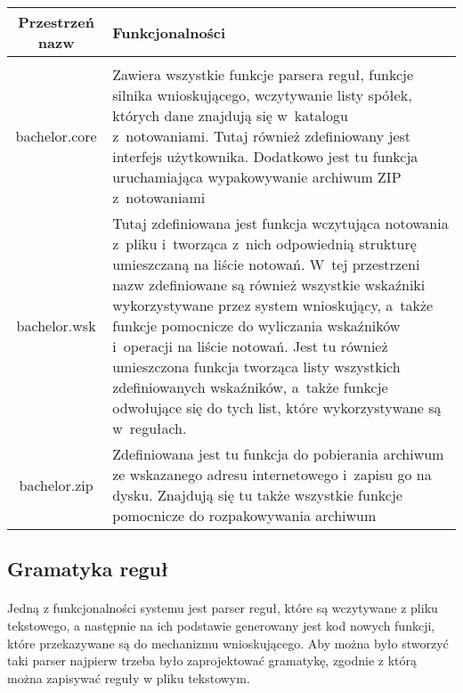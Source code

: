 \begin{tabular}{ c p{}}
Przestrzeń nazw & Funkcjonalności \\ \hline \\
bachelor.core & Zawiera wszystkie funkcje parsera reguł, funkcje silnika wnioskującego, wczytywanie listy spółek, których dane znajdują się w~katalogu z~notowaniami. Tutaj również zdefiniowany jest interfejs użytkownika. Dodatkowo jest tu funkcja uruchamiająca wypakowywanie archiwum ZIP z~notowaniami \\
bachelor.wsk & Tutaj zdefiniowana jest funkcja wczytująca notowania z~pliku i~tworząca z~nich odpowiednią strukturę umieszczaną na liście notowań. W~tej przestrzeni nazw zdefiniowane są również wszystkie wskaźniki wykorzystywane przez system wnioskujący, a~także funkcje pomocnicze do wyliczania wskaźników i~operacji na liście notowań. Jest tu również umieszczona funkcja tworząca listy wszystkich zdefiniowanych wskaźników, a~także funkcje odwołujące się do tych list, które wykorzystywane są w~regułach. \\
bachelor.zip & Zdefiniowana jest tu funkcja do pobierania archiwum ze wskazanego adresu internetowego i~zapisu go na dysku. Znajdują się tu także wszystkie funkcje pomocnicze do rozpakowywania archiwum \\
\end{tabular}

\subsection{Gramatyka reguł}

\paragraph{}
Jedną z funkcjonalności systemu jest parser reguł, które są wczytywane z pliku tekstowego, a następnie na ich podstawie generowany jest kod nowych funkcji, które przekazywane są do mechanizmu wnioskującego. Aby można było stworzyć taki parser najpierw trzeba było zaprojektować gramatykę, zgodnie z którą można zapisywać reguły w pliku tekstowym.